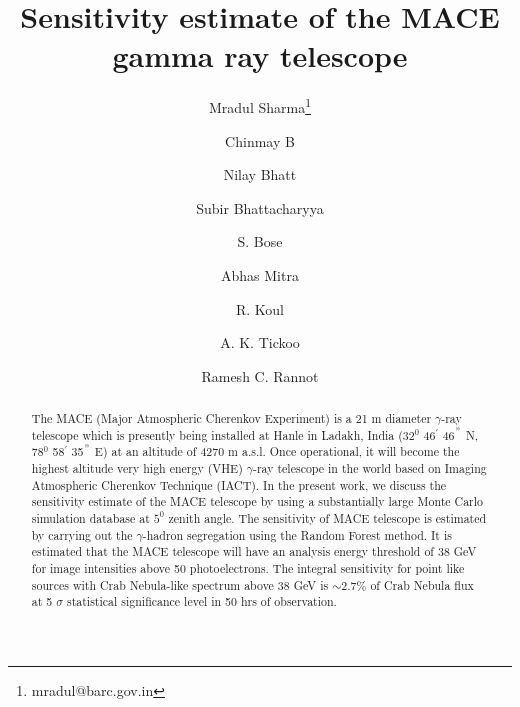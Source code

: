 \documentclass[preprint,12pt]{elsarticle}
\begin{document}
\begin{frontmatter}



\title{Sensitivity estimate of the MACE gamma ray telescope}


\author[lab1]{Mradul Sharma\footnote{\small mradul@barc.gov.in}}
\author[lab1]{Chinmay B}
\author[lab1]{Nilay Bhatt}
\author[lab1]{Subir Bhattacharyya}
\author[lab2]{S. Bose}
\author[lab1]{Abhas Mitra}
\author[lab1]{R. Koul}
\author[lab1]{A. K. Tickoo}
\author[lab1]{Ramesh C. Rannot}

\address[lab1]{Astrophysical Sciences Division, Bhabha Atomic Research Centre, Mumbai, India}
\address[lab2]{The Bayesian and Interdisciplinary Research Unit, Indian Statistical Institute,Kolkata, India}


\begin{abstract}
The MACE (Major Atmospheric Cherenkov Experiment) is a 21 m diameter $\gamma$-ray telescope which 
is presently being installed at Hanle in Ladakh, India (32$^0$  46$^{'}$ 46$^{"}$ N, 78$^0$ 58$^{'}$ 35$^{"}$ E) 
at an altitude of 4270 m a.s.l. Once operational, it will become the highest altitude very high energy (VHE) 
$\gamma$-ray telescope in the world based on Imaging Atmospheric Cherenkov Technique (IACT). In the present 
work, we discuss the sensitivity estimate of the MACE telescope by using a substantially large Monte Carlo 
simulation database at $5^0$ zenith angle. The sensitivity of MACE telescope is  estimated by carrying out 
the $\gamma$-hadron segregation using the Random Forest method. It is estimated that the MACE telescope will 
have an analysis energy threshold of 38 GeV for image intensities above 50 photoelectrons. 
The integral sensitivity for point like sources with Crab Nebula-like spectrum 
above 38 GeV is $\sim 2.7\%$ of Crab Nebula flux at 5 $\sigma$ statistical 
significance level in 50 hrs of observation.
\end{abstract}


\end{frontmatter}
\end{document}
